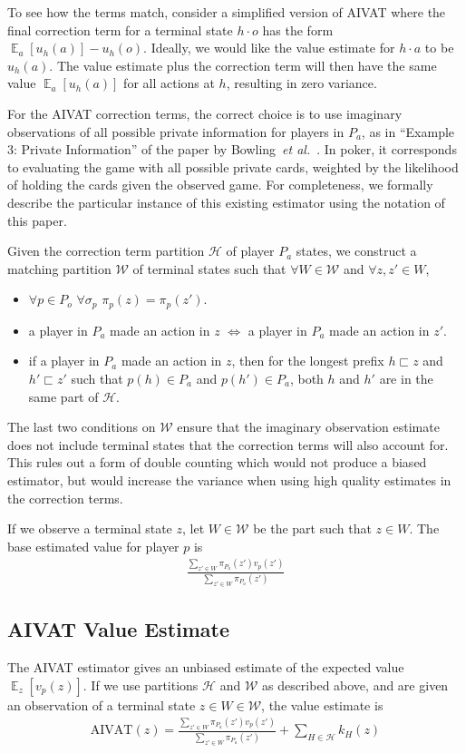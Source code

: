 \documentclass[letterpaper]{article}
\def\VAT{AIVAT}
\def\etal{\textit{et al.}}
\begin{document}
To see how the terms match, consider a simplified version of \VAT{}
where the final correction term for a terminal state $h \cdot o$ has
the form $\mathop{\mathbb{E}}_a[u_h(a)] - u_h(o)$. Ideally, we would
like the value estimate for $h \cdot a$ to be $u_h(a)$. The value
estimate plus the correction term will then have the same value
$\mathop{\mathbb{E}}_a[u_h(a)]$ for all actions at $h$, resulting in
zero variance.

For the \VAT{} correction terms, the correct choice is to use
imaginary observations of all possible private information for players
in $P_a$, as in ``Example 3: Private Information'' of the paper by
Bowling~\etal{}~\cite{08icml-ispoker}. In poker, it corresponds to
evaluating the game with all possible private cards, weighted by the
likelihood of holding the cards given the observed game. For
completeness, we formally describe the particular instance of this
existing estimator using the notation of this paper.

Given the correction term partition $\mathcal{H}$ of player $P_a$
states, we construct a matching partition $\mathcal{W}$ of terminal
states such that $\forall W \in \mathcal{W}$ and $\forall z,z' \in W$,
\begin{itemize}
\item $\forall p \in P_o$ $\forall \sigma_p$ $\pi_p(z) =
  \pi_p(z')$.
\item a player in $P_a$ made an action in $z$ $\iff$ a player in $P_a$
  made an action in $z'$.
\item if a player in $P_a$ made an action in $z$, then for the longest
  prefix $h \sqsubset z$ and $h' \sqsubset z'$ such that $p(h) \in
  P_a$ and $p(h') \in P_a$, both $h$ and $h'$ are in the same part of
  $\mathcal{H}$.
\end{itemize}
The last two conditions on $\mathcal{W}$ ensure that the imaginary
observation estimate does not include terminal states that the
correction terms will also account for. This rules out a form of
double counting which would not produce a biased estimator, but would
increase the variance when using high quality estimates in the
correction terms.

If we observe a terminal state $z$, let $W \in \mathcal{W}$ be the
part such that $z \in W$. The base estimated value for player $p$ is
\begin{align*}
\frac{\sum_{z' \in W} \pi_{P_a}(z') v_p(z')}{\sum_{z' \in W}\pi_{P_a}(z')}
\end{align*}

\subsection{\VAT{} Value Estimate}
The \VAT{} estimator gives an unbiased estimate of the expected value
$\mathop{\mathbb{E}}_z[v_p(z)]$. If we use partitions $\mathcal{H}$
and $\mathcal{W}$ as described above, and are given an observation of
a terminal state $z \in W \in \mathcal{W}$, the value estimate is
\begin{align}
\label{eqn:vat}
\text{\VAT{}}(z) = \frac{\sum_{z' \in W} \pi_{P_a}(z')
v_p(z')}{\sum_{z' \in W}\pi_{P_a}(z')} + \sum_{H \in \mathcal{H}}
k_H(z)
\end{align}
\end{document}
